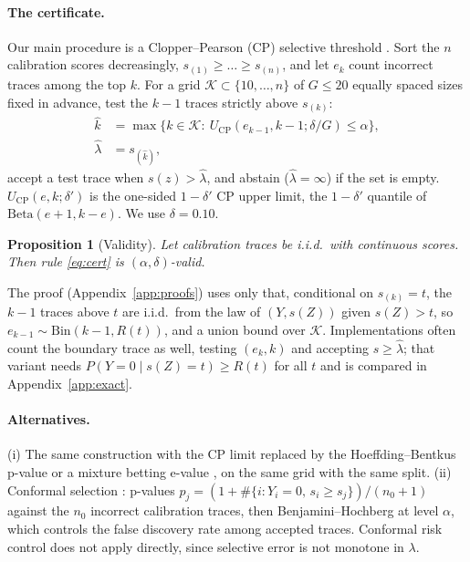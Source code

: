 \documentclass[twoside]{article}
\newtheorem{proposition}{Proposition}
\theoremstyle{remark}
\newcommand{\Rsel}{R}
\newcommand{\lamhat}{\hat\lambda}
\newcommand{\Ucp}{U_{\mathrm{CP}}}
\begin{document}
\paragraph{The certificate.} Our main procedure is a Clopper--Pearson (CP) selective threshold \citep{clopper1934use,geifman2017selective}. Sort the $n$ calibration scores decreasingly, $s_{(1)}\ge\dots\ge s_{(n)}$, and let $e_k$ count incorrect traces among the top $k$. For a grid $\mathcal K\subset\{10,\dots,n\}$ of $G\le20$ equally spaced sizes fixed in advance, test the $k-1$ traces strictly above $s_{(k)}$:
\begin{equation}
\begin{aligned}
\hat k&=\max\{k\in\mathcal K:\ \Ucp(e_{k-1},k-1;\delta/G)\le\alpha\},\\ \lamhat&=s_{(\hat k)},
\end{aligned}
\label{eq:cert}
\end{equation}
accept a test trace when $s(z)>\lamhat$, and abstain ($\lamhat=\infty$) if the set is empty. $\Ucp(e,k;\delta')$ is the one-sided $1-\delta'$ CP upper limit, the $1-\delta'$ quantile of $\mathrm{Beta}(e+1,k-e)$. We use $\delta=0.10$.

\begin{proposition}[Validity]
\label{prop:valid}
Let calibration traces be i.i.d.\ with continuous scores. Then rule \eqref{eq:cert} is $(\alpha,\delta)$-valid.
\end{proposition}

The proof (Appendix~\ref{app:proofs}) uses only that, conditional on $s_{(k)}=t$, the $k-1$ traces above $t$ are i.i.d.\ from the law of $(Y,s(Z))$ given $s(Z)>t$, so $e_{k-1}\sim\mathrm{Bin}(k-1,\Rsel(t))$, and a union bound over $\mathcal K$. Implementations often count the boundary trace as well, testing $(e_k,k)$ and accepting $s\ge\lamhat$; that variant needs $P(Y=0\mid s(Z)=t)\ge\Rsel(t)$ for all $t$ and is compared in Appendix~\ref{app:exact}.

\paragraph{Alternatives.} (i) The same construction with the CP limit replaced by the Hoeffding--Bentkus p-value \citep{bates2021rcps,bentkus2004hoeffding,angelopoulos2021ltt} or a mixture betting e-value \citep{waudby2024betting}, on the same grid with the same split. (ii) Conformal selection \citep{jin2023selection}: p-values $p_j=(1+\#\{i:Y_i=0,\,s_i\ge s_j\})/(n_0+1)$ against the $n_0$ incorrect calibration traces, then Benjamini--Hochberg \citep{benjamini1995controlling} at level $\alpha$, which controls the false discovery rate among accepted traces. Conformal risk control \citep{angelopoulos2024crc} does not apply directly, since selective error is not monotone in $\lambda$.
\end{document}
